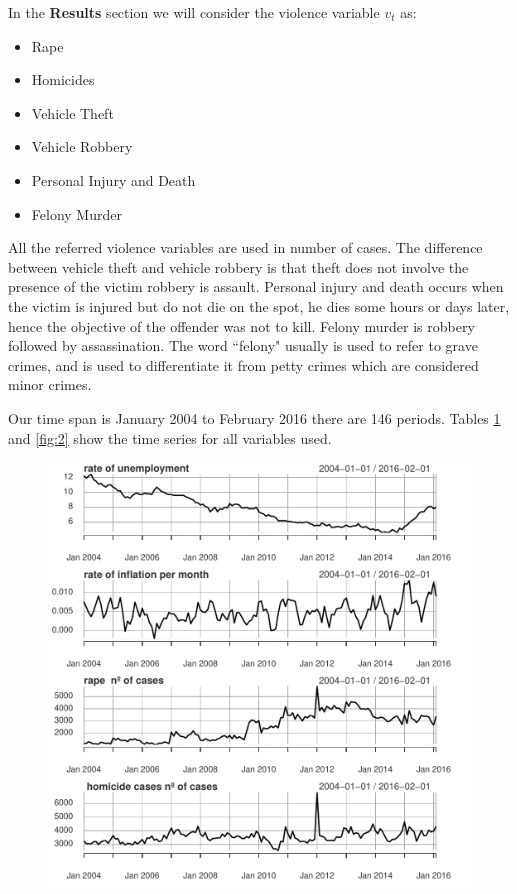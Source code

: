 \documentclass[11pt, a4paper]{article}
\begin{document}
In the \textbf{Results } section we will consider the violence variable $v_t$ as:
\begin{small}
\begin{itemize}
\item Rape
\item Homicides
\item Vehicle Theft
\item Vehicle Robbery
\item Personal Injury and Death
\item Felony Murder
\end{itemize}
\end{small}


All the referred violence variables are used in number of cases. The difference between vehicle theft and vehicle robbery is that theft does not involve the presence of the victim robbery is assault. Personal injury  and death occurs when the victim is injured but do not die on the spot, he dies some hours or days  later, hence the objective of the offender was not to kill. Felony murder is robbery followed by assassination. The word ``felony" usually is used to refer to grave crimes, and is used to differentiate it from petty crimes which are considered minor crimes.


Our time span is January 2004 to February 2016 there are 146 periods. Tables \ref{fig:1} and \ref{fig:2} show the time series for all variables used.


\begin{figure}[H]
\caption{}
\centering
\includegraphics[width=15cm]{graph1}
\label{fig:1}
\end{figure}
\end{document}
